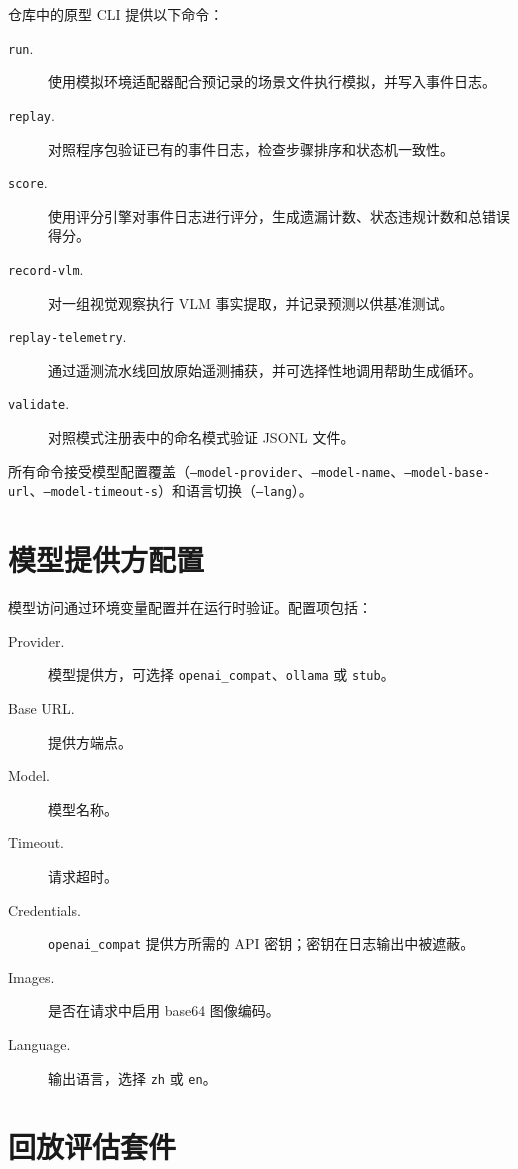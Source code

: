 仓库中的原型 CLI 提供以下命令：

\begin{description}
\item[\texttt{run}.] 使用模拟环境适配器配合预记录的场景文件执行模拟，并写入事件日志。
\item[\texttt{replay}.] 对照程序包验证已有的事件日志，检查步骤排序和状态机一致性。
\item[\texttt{score}.] 使用评分引擎对事件日志进行评分，生成遗漏计数、状态违规计数和总错误得分。
\item[\texttt{record-vlm}.] 对一组视觉观察执行 VLM 事实提取，并记录预测以供基准测试。
\item[\texttt{replay-telemetry}.] 通过遥测流水线回放原始遥测捕获，并可选择性地调用帮助生成循环。
\item[\texttt{validate}.] 对照模式注册表中的命名模式验证 JSONL 文件。
\end{description}

所有命令接受模型配置覆盖（\texttt{--model-provider}、\texttt{--model-name}、\texttt{--model-base-url}、\texttt{--model-timeout-s}）和语言切换（\texttt{--lang}）。

\section{模型提供方配置}\label{sec:appendix-model-config}

模型访问通过环境变量配置并在运行时验证。配置项包括：

\begin{description}
\item[Provider.] 模型提供方，可选择 \texttt{openai\_compat}、\texttt{ollama} 或 \texttt{stub}。
\item[Base URL.] 提供方端点。
\item[Model.] 模型名称。
\item[Timeout.] 请求超时。
\item[Credentials.] \texttt{openai\_compat} 提供方所需的 API 密钥；密钥在日志输出中被遮蔽。
\item[Images.] 是否在请求中启用 base64 图像编码。
\item[Language.] 输出语言，选择 \texttt{zh} 或 \texttt{en}。
\end{description}

\section{回放评估套件}\label{sec:appendix-replay}

